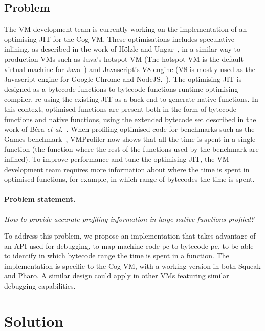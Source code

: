 \documentclass[10pt,preprint,nonatbib]{sigplanconf}
\newcommand{\etal}{\emph{et al.}\xspace}
\begin{document}
\subsection{Problem}

The VM development team is currently working on the implementation of an optimising JIT for the Cog VM. These optimisations includes speculative inlining, as described in the work of H\"olzle and Ungar~\cite{Holz94a}, in a similar way to production VMs such as Java's hotspot VM (The hotspot VM is the default virtual machine for Java~\cite{Pale01a}) and Javascript's V8 engine (V8 is mostly used as the Javascript engine for Google Chrome and NodeJS.~\cite{V8}). The optimising JIT is designed as a bytecode functions to bytecode functions runtime optimising compiler, re-using the existing JIT as a back-end to generate native functions. In this context, optimised functions are present both in the form of bytecode functions and native functions, using the extended bytecode set described in the work of B\'era \etal~\cite{Bera14a}. When profiling optimised code for benchmarks such as the Games benchmark~\cite{GameBenchs}, VMProfiler now shows that all the time is spent in a single function (the function where the rest of the functions used by the benchmark are inlined). To improve performance and tune the optimising JIT, the VM development team requires more information about where the time is spent in optimised functions, for example, in which range of bytecodes the time is spent.

\vspace{0.2cm}
\paragraph{Problem statement.} \emph{How to provide accurate profiling information in large native functions profiled?}
\vspace{0.2cm}

To address this problem, we propose an implementation that takes advantage of an API used for debugging, to map machine code pc to bytecode pc, to be able to identify in which bytecode range the time is spent in a function. The implementation is specific to the Cog VM, with a working version in both Squeak and Pharo. A similar design could apply in other VMs featuring similar debugging capabilities.


\section{Solution}
\end{document}
